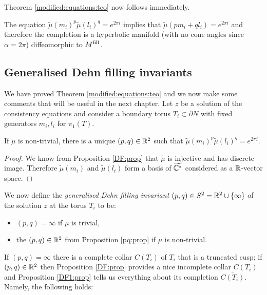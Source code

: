 Theorem \ref{modified:equations:teo} now follows immediately.

The equation $\tilde\mu(m_i)^p\tilde\mu(l_i)^q = e^{2\pi i}$ implies that $\tilde\mu(pm_i + ql_i) = e^{2\pi i}$ and therefore the completion is a hyperbolic manifold (with no cone angles since $\alpha = 2\pi$) diffeomorphic to $M^{\rm fill}$.
\finedimo

\subsection{Generalised Dehn filling invariants} \label{generalized:DF:subsection}
We have proved Theorem \ref{modified:equations:teo} and we now make some comments that will be useful in the next chapter. Let $z$ be a solution of the consistency equations and consider a boundary torus $T_i\subset \partial N$ with fixed generators $m_i,l_i$ for $\pi_1(T)$.

\begin{prop} \label{pq:prop}
If $\mu$ is non-trivial, there is a unique $(p,q)\in\mathbb{R}^2$ such that $\tilde\mu(m_i)^p \tilde\mu(l_i)^q = e^{2\pi i}$.
\end{prop}
\begin{proof}
We know from Proposition \ref{DF:prop} that $\tilde\mu$ is injective and has discrete image. Therefore $\tilde\mu(m_i)$ and $\tilde\mu(l_i)$ form a basis of $\widetilde{\mathbb{C}^*}$ considered as a $\mathbb{R}$-vector space.
\end{proof}

We now define the \emph{generalised Dehn filling invariant} $(p,q)\in S^2 = \mathbb{R}^2 \cup \{\infty\}$ of the solution $z$ at the torus $T_i$ to be:
\begin{itemize}
\item $(p,q) = \infty$ if $\mu$ is trivial,
\item the $(p,q)\in\mathbb{R}^2$ from Proposition \ref{pq:prop} if $\mu$ is non-trivial.
\end{itemize}

If $(p,q)=\infty$ there is a complete collar $C(T_i)$ of $T_i$ that is a truncated cusp; if $(p,q) \in \mathbb{R}^2$ then Proposition \ref{DF:prop} provides a nice incomplete collar $C(T_i)$ and Proposition \ref{DF1:prop} tells us everything about its completion $\overline{C(T_i)}$. Namely, the following holds:

